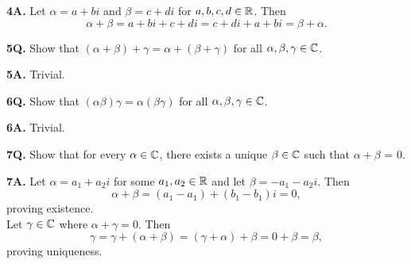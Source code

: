 \documentclass[12pt, letterpaper]{article}
\begin{document}
\textbf{4A.}
Let $\alpha = a + bi$ and $\beta = c + di$ for $a,b,c,d\in\mathbb{R}$. Then
$$\alpha + \beta = a + bi + c + di = c + di + a + bi = \beta + \alpha.$$

\textbf{5Q.} Show that $(\alpha+\beta)+\gamma=\alpha+(\beta+\gamma)$ for all $\alpha,\beta,\gamma\in\mathbb{C}$.

\textbf{5A.} Trivial.

\textbf{6Q.} Show that $(\alpha\beta)\gamma=\alpha(\beta\gamma)$ for all $\alpha,\beta,\gamma\in\mathbb{C}$.

\textbf{6A.} Trivial.

\textbf{7Q.} Show that for every $\alpha\in\mathbb{C}$, there exists a unique $\beta\in\mathbb{C}$ such that $\alpha+\beta$ = 0.

\textbf{7A.} Let $\alpha=a_1+a_2i$ for some $a_1,a_2\in\mathbb{R}$ and let $\beta = -a_1-a_2i$. Then
$$\alpha+\beta=(a_1-a_1)+(b_1-b_1)i=0,$$
proving existence. 
\\Let $\gamma\in\mathbb{C}$ where $\alpha+\gamma=0$. Then
$$\gamma = \gamma + (\alpha + \beta) = (\gamma + \alpha) +\beta = 0 + \beta = \beta,$$
proving uniqueness.
\end{document}
